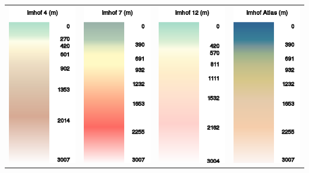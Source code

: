 \begin{longtable}{c c c c}
\includegraphics[angle=0,width=3.0cm,keepaspectratio='true']{figures/ramp-terrain-imhof4.png}&
\includegraphics[angle=0,width=3.0cm,keepaspectratio='true']{figures/ramp-terrain-imhof7.png}&
\includegraphics[angle=0,width=3.0cm,keepaspectratio='true']{figures/ramp-terrain-imhof12.png}&
\includegraphics[angle=0,width=3.0cm,keepaspectratio='true']{figures/ramp-terrain-imhofatlas.png}
\end{longtable}



